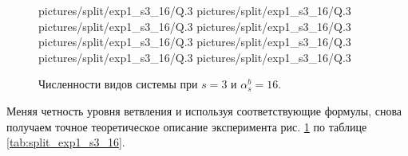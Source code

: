 \begin{figure}[H]
    \centering
       {pictures/split/exp1_s3_16/Q}{.3}
      {pictures/split/exp1_s3_16/Q}{.3}
      {pictures/split/exp1_s3_16/Q}{.3}
      {pictures/split/exp1_s3_16/Q}{.3}
      {pictures/split/exp1_s3_16/Q}{.3}
      {pictures/split/exp1_s3_16/Q}{.3}
     {pictures/split/exp1_s3_16/Q}{.3}
     {pictures/split/exp1_s3_16/Q}{.3}
\caption{Численности видов системы при \(s=3\) и \(\alpha^b_s = 16\).} \label{fig:split_exp1_s3_16}
\end{figure}
Меняя четность уровня ветвления и используя соответствующие формулы, снова получаем точное теоретическое описание эксперимента рис. \ref{fig:split_exp1_s3_16} по таблице \ref{tab:split_exp1_s3_16}.


